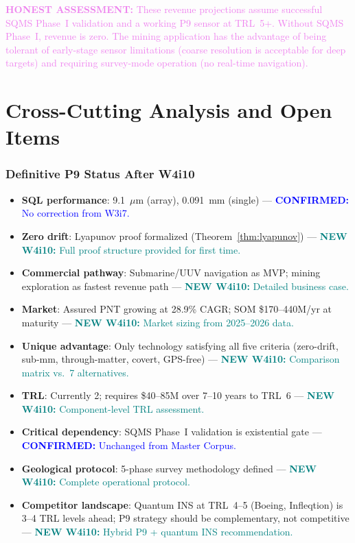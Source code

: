 \documentclass[11pt]{article}
\theoremstyle{definition}
\theoremstyle{remark}
\newcommand{\confirmed}[1]{\textcolor{blue}{\textbf{CONFIRMED:} #1}}
\newcommand{\honest}[1]{\textcolor{violet}{\textbf{HONEST ASSESSMENT:} #1}}
\newcommand{\newfinding}[1]{\textcolor{teal}{\textbf{NEW W4i10:} #1}}
\begin{document}
\honest{These revenue projections assume successful SQMS Phase~I validation
and a working P9 sensor at TRL~5+. Without SQMS Phase~I, revenue is zero.
The mining application has the advantage of being tolerant of early-stage
sensor limitations (coarse resolution is acceptable for deep targets) and
requiring survey-mode operation (no real-time navigation).}

\part{Cross-Cutting Analysis and Open Items}
\label{part:synthesis}

\section{Definitive P9 Status After W4i10}
\label{sec:status}

\begin{tcolorbox}[colback=green!5!white, colframe=green!40!black,
  title=\textbf{P9 Status: ALIVE --- Nearest Commercial Opportunity (Confirmed)}]
\begin{itemize}[nosep]
\item \textbf{SQL performance}: 9.1~$\mu$m (array), 0.091~mm (single) ---
  \confirmed{No correction from W3i7.}
\item \textbf{Zero drift}: Lyapunov proof formalized (Theorem~\ref{thm:lyapunov}) ---
  \newfinding{Full proof structure provided for first time.}
\item \textbf{Commercial pathway}: Submarine/UUV navigation as MVP; mining
  exploration as fastest revenue path --- \newfinding{Detailed business case.}
\item \textbf{Market}: Assured PNT growing at 28.9\% CAGR; SOM \$170--440M/yr
  at maturity --- \newfinding{Market sizing from 2025--2026 data.}
\item \textbf{Unique advantage}: Only technology satisfying all five criteria
  (zero-drift, sub-mm, through-matter, covert, GPS-free) ---
  \newfinding{Comparison matrix vs.\ 7 alternatives.}
\item \textbf{TRL}: Currently 2; requires \$40--85M over 7--10 years to TRL~6 ---
  \newfinding{Component-level TRL assessment.}
\item \textbf{Critical dependency}: SQMS Phase~I validation is existential gate ---
  \confirmed{Unchanged from Master Corpus.}
\item \textbf{Geological protocol}: 5-phase survey methodology defined ---
  \newfinding{Complete operational protocol.}
\item \textbf{Competitor landscape}: Quantum INS at TRL~4--5 (Boeing, Infleqtion)
  is 3--4 TRL levels ahead; P9 strategy should be complementary, not competitive ---
  \newfinding{Hybrid P9 + quantum INS recommendation.}
\end{itemize}
\end{tcolorbox}
\end{document}
